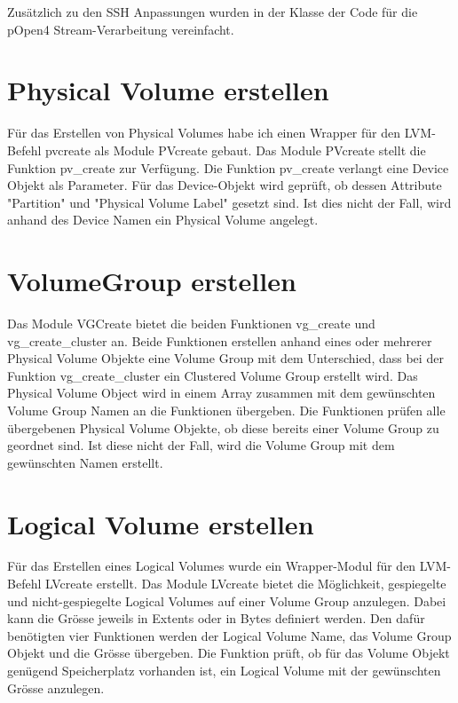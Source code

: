 \lstset{language=Ruby, basicstyle=\footnotesize, showstringspaces=false, tabsize=2}


Zusätzlich zu den SSH Anpassungen wurden in der Klasse der Code für die pOpen4 Stream-Verarbeitung vereinfacht. 

\section{Physical Volume erstellen}
Für das Erstellen von Physical Volumes habe ich einen Wrapper für den LVM-Befehl pvcreate als Module PVcreate gebaut. Das Module PVcreate stellt die Funktion pv\_create zur Verfügung. Die Funktion pv\_create verlangt eine Device Objekt als Parameter. Für das Device-Objekt wird geprüft, ob dessen Attribute "Partition" und "Physical Volume Label" gesetzt sind. Ist dies nicht der Fall, wird anhand des Device Namen ein Physical Volume angelegt.

\lstset{language=Ruby, basicstyle=\footnotesize, showstringspaces=false, tabsize=2}


\section{VolumeGroup erstellen}
Das Module VGCreate bietet die beiden Funktionen vg\_create und vg\_create\_cluster an. Beide Funktionen erstellen anhand eines oder mehrerer Physical Volume Objekte eine Volume Group mit dem Unterschied, dass bei der Funktion  vg\_create\_cluster ein Clustered Volume Group erstellt wird. Das Physical Volume Object wird in einem Array zusammen mit dem gewünschten Volume Group Namen an die Funktionen übergeben. Die Funktionen prüfen alle übergebenen Physical Volume Objekte, ob diese bereits einer Volume Group zu geordnet sind. Ist diese nicht der Fall, wird die Volume Group mit dem gewünschten Namen erstellt. 

\lstset{language=Ruby, basicstyle=\footnotesize, showstringspaces=false, tabsize=2}


\section{Logical Volume erstellen}
Für das Erstellen eines Logical Volumes wurde ein Wrapper-Modul für den LVM-Befehl LVcreate erstellt. Das Module LVcreate bietet die Möglichkeit, gespiegelte und nicht-gespiegelte Logical Volumes auf einer Volume Group anzulegen. Dabei kann die Grösse jeweils in Extents oder in Bytes definiert werden.
Den dafür benötigten vier Funktionen werden der Logical Volume Name, das Volume Group Objekt und die Grösse übergeben. Die Funktion prüft, ob für das Volume Objekt genügend Speicherplatz vorhanden ist, ein Logical Volume mit der gewünschten Grösse anzulegen.

